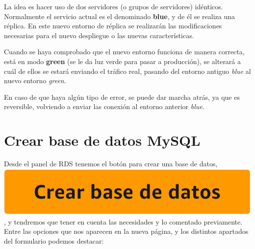 La idea es hacer uso de dos servidores (o grupos de servidores) idénticos. Normalmente el servicio actual es el denominado \textbf{blue}, y de él se realiza una réplica. En este nuevo entorno de réplica se realizarán las modificaciones necesarias para el nuevo despliegue o las nuevas características.

Cuando se haya comprobado que el nuevo entorno funciona de manera correcta, está en modo \textbf{green} (se le da luz verde para pasar a producción), se alterará a cuál de ellos se estará enviando el tráfico real, pasando del entorno antiguo \textit{blue} al nuevo entorno \textit{green}.

En caso de que haya algún tipo de error, se puede dar marcha atrás, ya que es reversible, volviendo a enviar las conexión al entorno anterior \textit{blue}.


\chapter{Crear base de datos MySQL}

Desde el panel de RDS tenemos el botón para crear una base de datos,  \includegraphics[height=0.8\baselineskip]{img/aws/rds_create.png}, y tendremos que tener en cuenta las necesidades y lo comentado previamente. Entre las opciones que nos aparecen en la nueva página, y los distintos apartados del formulario podemos destacar:


